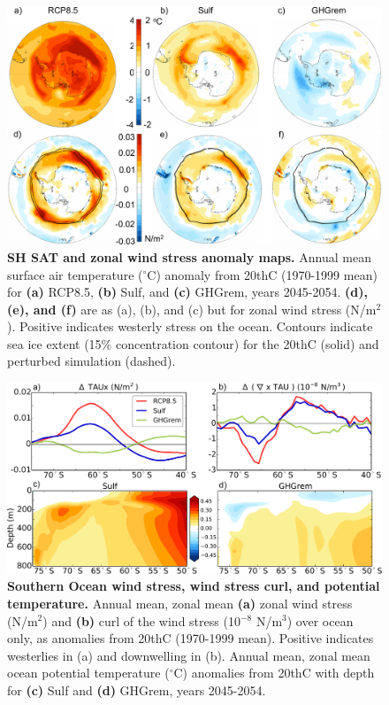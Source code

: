 \documentclass{nature}
\begin{document}
\begin{figure}%
 \noindent\includegraphics[width=30pc]{figures/SHmaps3.pdf}
\caption{\textbf{SH SAT and zonal wind stress anomaly maps.} Annual mean surface air temperature ($^\circ$C) anomaly from 20thC (1970-1999 mean) for \textbf{(a)} RCP8.5, \textbf{(b)} Sulf, and \textbf{(c)} GHGrem, years 2045-2054. \textbf{(d), (e), and (f)} are as (a), (b), and (c) but for zonal wind stress (N/m$^2$). Positive indicates westerly stress on the ocean. Contours indicate sea ice extent (15\% concentration contour) for the 20thC (solid) and perturbed simulation (dashed).}
\label{fig:shmaps}
\end{figure}

\begin{figure}%
 \noindent\includegraphics[width=35pc]{figures/TAUcurl_TEMPanomMOCeddy+eul.pdf}
\caption{\textbf{Southern Ocean wind stress, wind stress curl, and potential temperature.} Annual mean, zonal mean \textbf{(a)} zonal wind stress (N/m$^2$) and \textbf{(b)} curl of the wind stress (10$^{-8}$ N/m$^3$) over ocean only, as anomalies from 20thC (1970-1999 mean). Positive indicates westerlies in (a) and downwelling in (b). Annual mean, zonal mean ocean potential temperature ($^\circ$C) anomalies from 20thC with depth for \textbf{(c)} Sulf and \textbf{(d)} GHGrem, years 2045-2054.}
\label{fig:zmtautemp}
\end{figure}
\end{document}

